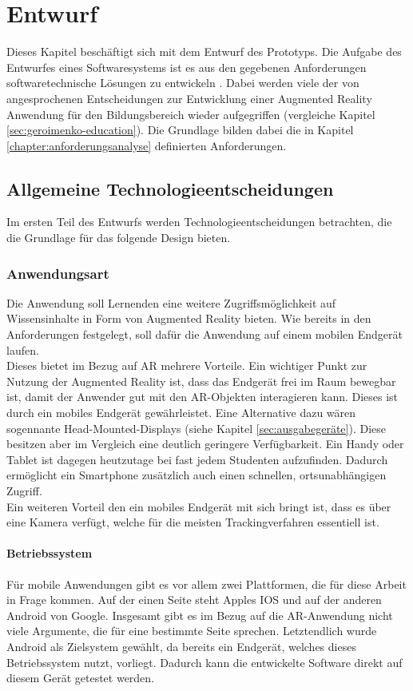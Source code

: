 \chapter{Entwurf}\label{chapter:entwurf}
Dieses Kapitel beschäftigt sich mit dem Entwurf des Prototyps. Die Aufgabe des Entwurfes eines Softwaresystems ist es aus den gegebenen Anforderungen softwaretechnische Lösungen zu entwickeln \citep{balzert:softwaretechnik}. Dabei werden viele der von \citet{geroimenko:ar-in-education} angesprochenen Entscheidungen zur Entwicklung einer Augmented Reality Anwendung für den Bildungsbereich wieder aufgegriffen (vergleiche Kapitel \ref{sec:geroimenko-education}).
Die Grundlage bilden dabei die in Kapitel \ref{chapter:anforderungsanalyse} definierten Anforderungen.

\section{Allgemeine Technologieentscheidungen}
Im ersten Teil des Entwurfs werden Technologieentscheidungen betrachten, die die Grundlage für das folgende Design bieten.

\subsection{Anwendungsart}
Die Anwendung soll Lernenden eine weitere Zugriffsmöglichkeit auf Wissensinhalte in Form von Augmented Reality bieten.
Wie bereits in den Anforderungen festgelegt, soll dafür die Anwendung auf einem mobilen Endgerät laufen.\\
Dieses bietet im Bezug auf AR mehrere Vorteile. Ein wichtiger Punkt zur Nutzung der Augmented Reality ist, dass das Endgerät frei im Raum bewegbar ist, damit der Anwender gut mit den AR-Objekten interagieren kann. Dieses ist durch ein mobiles Endgerät gewährleistet. Eine Alternative dazu wären sogennante Head-Mounted-Displays (siehe Kapitel \ref{sec:ausgabegeräte}). Diese besitzen aber im Vergleich eine deutlich geringere Verfügbarkeit. Ein Handy oder Tablet ist dagegen heutzutage bei fast jedem Studenten aufzufinden. Dadurch ermöglicht ein Smartphone zusätzlich auch einen schnellen, ortsunabhängigen Zugriff. \\
Ein weiteren Vorteil den ein mobiles Endgerät mit sich bringt ist, dass es über eine Kamera verfügt, welche für die meisten Trackingverfahren essentiell ist. \\

\subsubsection{Betriebssystem}
Für mobile Anwendungen gibt es vor allem zwei Plattformen, die für diese Arbeit in Frage kommen. Auf der einen Seite steht Apples IOS und auf der anderen Android von Google. Insgesamt gibt es im Bezug auf die AR-Anwendung nicht viele Argumente, die für eine bestimmte Seite sprechen. Letztendlich wurde Android als Zielsystem gewählt, da bereits ein Endgerät, welches dieses Betriebssystem nutzt, vorliegt. Dadurch kann die entwickelte Software direkt auf diesem Gerät getestet werden. 

